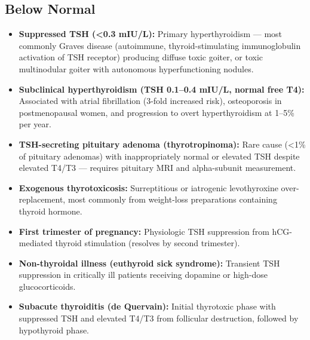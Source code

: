 \subsection*{Below Normal}
\begin{itemize}
  \item \textbf{Suppressed TSH (<0.3 mIU/L):} Primary hyperthyroidism --- most commonly Graves disease (autoimmune, thyroid-stimulating immunoglobulin activation of TSH receptor) producing diffuse toxic goiter, or toxic multinodular goiter with autonomous hyperfunctioning nodules.
  \item \textbf{Subclinical hyperthyroidism (TSH 0.1--0.4 mIU/L, normal free T4):} Associated with atrial fibrillation (3-fold increased risk), osteoporosis in postmenopausal women, and progression to overt hyperthyroidism at 1--5\% per year.
  \item \textbf{TSH-secreting pituitary adenoma (thyrotropinoma):} Rare cause (<1\% of pituitary adenomas) with inappropriately normal or elevated TSH despite elevated T4/T3 --- requires pituitary MRI and alpha-subunit measurement.
  \item \textbf{Exogenous thyrotoxicosis:} Surreptitious or iatrogenic levothyroxine over-replacement, most commonly from weight-loss preparations containing thyroid hormone.
  \item \textbf{First trimester of pregnancy:} Physiologic TSH suppression from hCG-mediated thyroid stimulation (resolves by second trimester).
  \item \textbf{Non-thyroidal illness (euthyroid sick syndrome):} Transient TSH suppression in critically ill patients receiving dopamine or high-dose glucocorticoids.
  \item \textbf{Subacute thyroiditis (de Quervain):} Initial thyrotoxic phase with suppressed TSH and elevated T4/T3 from follicular destruction, followed by hypothyroid phase.
\end{itemize}

